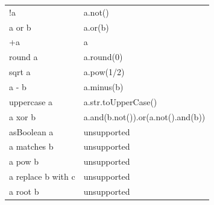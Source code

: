 \begin{table}[H]
\begin{center}
\begin{tabular}{|l|l|}
			!a                     & a.not()                            \\
			a or b                 & a.or(b)                            \\
			+a                     & a                                  \\
			round a                & a.round(0)                         \\
			sqrt a                 & a.pow(1/2)                         \\
			a - b                  & a.minus(b)                         \\
			uppercase a            & a.str.toUpperCase()                \\
			a xor b                & a.and(b.not()).or(a.not().and(b))  \\
			\hline
			asBoolean a            & unsupported                        \\
			a matches b            & unsupported                        \\
			a pow b                & unsupported                        \\
			a replace b with c     & unsupported                        \\
			a root b               & unsupported                        \\
			\hline
		\end{tabular}
	\end{center}
\end{table}

